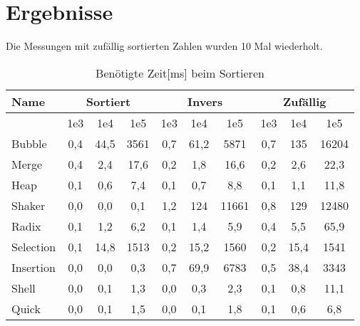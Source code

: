 \chapter{Ergebnisse}
Die Messungen mit zufällig sortierten Zahlen wurden 10 Mal wiederholt.

\begin{table}[!ht]
\begin{tabular}{l|ccc|ccc|ccc}
    Name & \multicolumn{3}{c}{Sortiert} & \multicolumn{3}{c}{Invers} & \multicolumn{3}{c}{Zufällig} \\
    \hline
     & 1e3 & 1e4 & 1e5 & 1e3 & 1e4 & 1e5 & 1e3 & 1e4 & 1e5 \\
    \hline
    Bubble     & 0,4 & 44,5 & 3561 & 0,7 & 61,2 & 5871 & 0,7 & 135 & 16204 \\
    Merge      & 0,4 & 2,4 & 17,6 & 0,2 & 1,8 & 16,6 & 0,2 & 2,6 & 22,3 \\
    Heap       & 0,1 & 0,6 & 7,4 & 0,1 & 0,7 & 8,8 & 0,1 & 1,1 & 11,8 \\
    Shaker     & 0,0 & 0,0 & 0,1 & 1,2 & 124 & 11661 & 0,8 & 129 & 12480 \\
    Radix      & 0,1 & 1,2 & 6,2 & 0,1 & 1,4 & 5,9 & 0,4 & 5,5 & 65,9 \\
    Selection  & 0,1 & 14,8 & 1513 & 0,2 & 15,2 & 1560 & 0,2 & 15,4 & 1541 \\
    Insertion  & 0,0 & 0,0 & 0,3 & 0,7 & 69,9 & 6783 & 0,5 & 38,4 & 3343 \\
    Shell      & 0,0 & 0,1 & 1,3 & 0,0 & 0,3 & 2,3 & 0,1 & 0,8 & 11,1 \\
    Quick      & 0,0 & 0,1 & 1,5 & 0,0 & 0,1 & 1,8 & 0,1 & 0,6 & 6,8 \\
\end{tabular}
\centering
\caption{Benötigte Zeit[ms] beim Sortieren}
\end{table}
\FloatBarrier